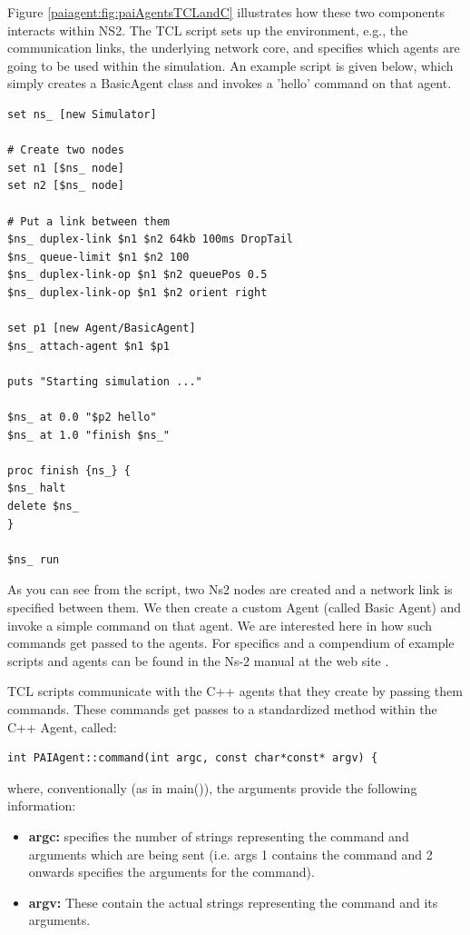 Figure \ref{paiagent:fig:paiAgentsTCLandC} illustrates how these two
components interacts within NS2.  The TCL script sets up the environment,
e.g., the communication links, the underlying network core, and specifies
which agents are going to be used  within the simulation. An example
script is given below, which simply creates a BasicAgent class and
invokes a 'hello' command on that agent.

\footnotesize
\begin{verbatim}
set ns_ [new Simulator]

# Create two nodes
set n1 [$ns_ node]
set n2 [$ns_ node]

# Put a link between them
$ns_ duplex-link $n1 $n2 64kb 100ms DropTail
$ns_ queue-limit $n1 $n2 100
$ns_ duplex-link-op $n1 $n2 queuePos 0.5
$ns_ duplex-link-op $n1 $n2 orient right

set p1 [new Agent/BasicAgent]
$ns_ attach-agent $n1 $p1

puts "Starting simulation ..."

$ns_ at 0.0 "$p2 hello"
$ns_ at 1.0 "finish $ns_"

proc finish {ns_} {
$ns_ halt
delete $ns_
}

$ns_ run
\end{verbatim}
\normalsize

As you can see from the script, two Ns2 nodes are created and
a network link is specified between them. We then create
a custom Agent (called Basic Agent) and invoke a simple command on
that agent.   We are interested here in how such commands get 
passed to the agents.  For specifics and a compendium of 
example scripts and agents can be found in the Ns-2 manual
at the web site \cite{ns2}.

TCL scripts communicate with the C++ agents that they create by
passing them commands.  These commands get passes to a
standardized method within the C++ Agent, called:

\footnotesize
\begin{verbatim}
int PAIAgent::command(int argc, const char*const* argv) {
\end{verbatim}
\normalsize

\noindent where, conventionally (as in main()), the arguments provide the following information:

\begin{itemize}
\item \textbf{argc:} specifies the number of strings representing the command
and arguments which are being sent (i.e. args 1 contains the command and 
2 onwards specifies the arguments for the command).    
\item \textbf{argv:} These contain the actual strings representing the command
and its arguments.
\end{itemize}

